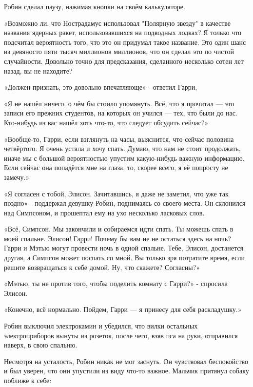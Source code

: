 \documentclass[a4paper,12pt]{book}
\begin{document}
\par
Робин сделал паузу, нажимая кнопки на своём калькуляторе.
\par
«Возможно ли, что Нострадамус использовал "Полярную звезду" в качестве названия ядерных ракет, использовавшихся на подводных лодках? Я только что подсчитал вероятность того, что это он придумал такое название. Это один шанс из девяносто пяти тысяч миллионов миллионов, что он сделал это по чистой случайности. Довольно точно для предсказания, сделанного несколько сотен лет назад, вы не находите?
\par
«Должен признать, это довольно впечатляюще» - ответил Гарри,
\par
«Я не нашёл ничего, о чём бы стоило упомянуть. Всё, что я прочитал — это записи его прежних студентов, на которых он учился — тех, что были до нас. Кто-нибудь из вас нашёл хоть что-то, что следует обсудить сейчас?»
\par
«Вообще-то, Гарри, если взглянуть на часы, выяснится, что сейчас половина четвёртого. Я очень устала и хочу спать. Думаю, что нам не стоит продолжать, иначе мы с большой вероятностью упустим какую-нибудь важную информацию. Если сейчас она попадётся мне на глаза, то, скорее всего, я её попросту не замечу.»
\par
«Я согласен с тобой, Элисон. Зачитавшись, я даже не заметил, что уже так поздно» - поддержал девушку Робин, поднимаясь со своего места. Он склонился над Симпсоном, и прошептал ему на ухо несколько ласковых слов.
\par
«Всё, Симпсон. Мы закончили и собираемся идти спать. Ты можешь спать в моей спальне. Элисон! Гарри! Почему бы вам не не остаться здесь на ночь? Гарри и Мэтью могут провести ночь в одной спальне. Тебе, Элисон, достанется другая, а Симпсон может поспать со мной. Вы только зря потратите время, если решите возвращаться к себе домой. Ну, что скажете? Согласны?»
\par
«Мэтью, ты не против того, чтобы поделить комнату с Гарри?» - спросила Элисон.
\par
«Конечно, всё нормально. Пойдем, Гарри — я принесу для себя раскладушку.»
\par
Робин выключил электрокамин и убедился, что вилки остальных электроприборов вынуты из розеток, после чего, взяв пса на руки, отправился наверх, в свою спальню.\\
\par
Несмотря на усталость, Робин никак не мог заснуть. Он чувствовал беспокойство и был уверен, что они упустили из виду что-то важное. Мальчик притянул собаку поближе к себе:
\end{document}
